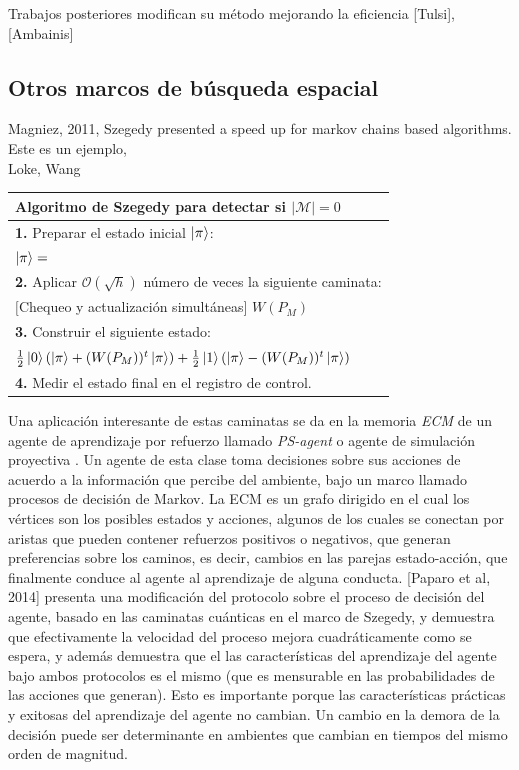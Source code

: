 Trabajos posteriores modifican su método mejorando la eficiencia [Tulsi], [Ambainis]

\subsection{Otros marcos de búsqueda espacial}
\cite{magniez2011search} Magniez, 2011,
\cite{szegedy2004quantum} Szegedy presented a speed up for markov chains based algorithms. \\
Este es un ejemplo, \\
Loke, Wang\\

\begin{center}
    \begin{tabular}{l}
    \hline \textbf{Algoritmo de Szegedy} para detectar \textbf{si $|\mathcal{M}|=0$}\\\hline 
    \textbf{1.} Preparar el estado inicial $\ket{\pi}$:\\
    $\ket{\pi}=$\\
    \textbf{2.} Aplicar $\mathcal{O}(\sqrt{h})$ número de veces la siguiente caminata:\\
    $[$Chequeo y actualización simultáneas$]$ $W(P_M)$\\
    \textbf{3.} Construir el siguiente estado:\\
    $\frac{1}{2}\ket{0}(\ket{\pi}+(W(P_M))^t\ket{\pi})+\frac{1}{2}\ket{1}(\ket{\pi}-(W(P_M))^t\ket{\pi})$\\
    \textbf{4.} Medir el estado final en el registro de control.\\\hline
    \end{tabular}{}
\end{center}{}

Una aplicación interesante de estas caminatas se da en la memoria \textit{ECM} de un agente de aprendizaje por refuerzo llamado \textit{PS-agent} o agente de simulación proyectiva \cite{briegel2012projective}. Un agente de esta clase toma decisiones sobre sus acciones de acuerdo a la información que percibe del ambiente, bajo un marco llamado procesos de decisión de Markov. La ECM es un grafo dirigido en el cual los vértices son los posibles estados y acciones, algunos de los cuales se conectan por aristas que pueden contener refuerzos positivos o negativos, que generan preferencias sobre los caminos, es decir, cambios en las parejas estado-acción, que finalmente conduce al agente al aprendizaje de alguna conducta. 
[Paparo et al, 2014]  presenta una modificación del protocolo sobre el proceso de decisión del agente, basado en las caminatas cuánticas en el marco de Szegedy, y demuestra que efectivamente la velocidad del proceso mejora cuadráticamente como se espera, y además demuestra que el las características del aprendizaje del agente bajo ambos protocolos es el mismo (que es mensurable en las probabilidades de las acciones que generan). Esto es importante porque las características prácticas y exitosas del aprendizaje del agente no cambian. Un cambio en la demora de la decisión puede ser determinante en ambientes que cambian en tiempos del mismo orden de magnitud.


